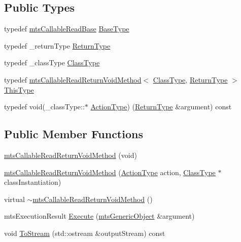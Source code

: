 \subsection*{Public Types}
\begin{DoxyCompactItemize}
\item 
typedef \hyperlink{classmts_callable_read_base}{mts\+Callable\+Read\+Base} \hyperlink{classmts_callable_read_return_void_method_a9dbeaf2b51dba8323c5672945801307c}{Base\+Type}
\item 
typedef \+\_\+return\+Type \hyperlink{classmts_callable_read_return_void_method_a7a7034303bbcaa112a28d75dd0a576d2}{Return\+Type}
\item 
typedef \+\_\+class\+Type \hyperlink{classmts_callable_read_return_void_method_a694e26a4c7fc28f0c739aa2f2ab97e12}{Class\+Type}
\item 
typedef \hyperlink{classmts_callable_read_return_void_method}{mts\+Callable\+Read\+Return\+Void\+Method}$<$ \hyperlink{classmts_callable_read_return_void_method_a694e26a4c7fc28f0c739aa2f2ab97e12}{Class\+Type}, \hyperlink{classmts_callable_read_return_void_method_a7a7034303bbcaa112a28d75dd0a576d2}{Return\+Type} $>$ \hyperlink{classmts_callable_read_return_void_method_a118254e466e472246199228424a10737}{This\+Type}
\item 
typedef void(\+\_\+class\+Type\+::$\ast$ \hyperlink{classmts_callable_read_return_void_method_a97673cc9242251e406bde738cb060781}{Action\+Type}) (\hyperlink{classmts_callable_read_return_void_method_a7a7034303bbcaa112a28d75dd0a576d2}{Return\+Type} \&argument) const 
\end{DoxyCompactItemize}
\subsection*{Public Member Functions}
\begin{DoxyCompactItemize}
\item 
\hyperlink{classmts_callable_read_return_void_method_a80d3ca3aaf921033aa3f14dd6a366877}{mts\+Callable\+Read\+Return\+Void\+Method} (void)
\item 
\hyperlink{classmts_callable_read_return_void_method_aeafc533326dd26e92a87d16bea066205}{mts\+Callable\+Read\+Return\+Void\+Method} (\hyperlink{classmts_callable_read_return_void_method_a97673cc9242251e406bde738cb060781}{Action\+Type} action, \hyperlink{classmts_callable_read_return_void_method_a694e26a4c7fc28f0c739aa2f2ab97e12}{Class\+Type} $\ast$class\+Instantiation)
\item 
virtual \hyperlink{classmts_callable_read_return_void_method_a55a3d639bf248372bf6ab44663020236}{$\sim$mts\+Callable\+Read\+Return\+Void\+Method} ()
\item 
mts\+Execution\+Result \hyperlink{classmts_callable_read_return_void_method_a79de3217cc169c8d1a47e57234c6481b}{Execute} (\hyperlink{classmts_generic_object}{mts\+Generic\+Object} \&argument)
\item 
void \hyperlink{classmts_callable_read_return_void_method_a27a38456119252878ace309de008be50}{To\+Stream} (std\+::ostream \&output\+Stream) const 
\end{DoxyCompactItemize}
